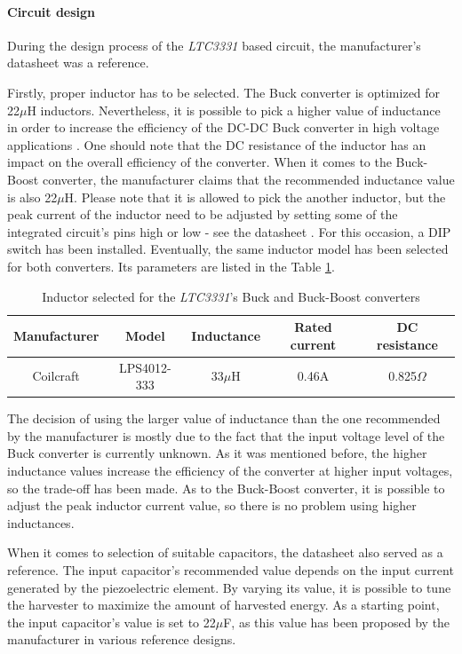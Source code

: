 \documentclass[12pt,a4paper]{article}
\begin{document}
\paragraph{Circuit design}
During the design process of the \textit{LTC3331} based circuit, the manufacturer's datasheet \cite{ltc3331_params} was a reference.
\par
Firstly, proper inductor has to be selected. The Buck converter is optimized for 22$\mu$H inductors. Nevertheless, it is possible to pick a higher value of inductance in order to increase the efficiency of the DC-DC Buck converter in high voltage applications \cite{ltc3331_params}. One should note that the DC resistance of the inductor has an impact on the overall efficiency of the converter. When it comes to the Buck-Boost converter, the manufacturer claims that the recommended inductance value is also 22$\mu$H. Please note that it is allowed to pick the another inductor, but the peak current of the inductor need to be adjusted by setting some of the integrated circuit's pins high or low - see the datasheet \cite{ltc3331_params}. For this occasion, a DIP switch has been installed. Eventually, the same inductor model has been selected for both converters. Its parameters are listed in the Table \ref{tab:ltc3331_inductor}.
\begin{table}[ht!]
\begin{tabular}{|c|c|c|c|c|}
\hline
\textbf{Manufacturer} & \textbf{Model} & \textbf{Inductance} & \textbf{Rated current} & \textbf{DC resistance}	\\ \hline
 Coilcraft & LPS4012-333 & 33$\mu$H & 0.46A & 0.825$\Omega$      \\ \hline
\end{tabular}
\caption{Inductor selected for the \textit{LTC3331}'s Buck and Buck-Boost converters \cite{ltc3331_inductor_params}}
\label{tab:ltc3331_inductor}
\end{table}
\par
The decision of using the larger value of inductance than the one recommended by the manufacturer is mostly due to the fact that the input voltage level of the Buck converter is currently unknown. As it was mentioned before, the higher inductance values increase the efficiency of the converter at higher input voltages, so the trade-off has been made. As to the Buck-Boost converter, it is possible to adjust the peak inductor current value, so there is no problem using higher inductances.
\par
When it comes to selection of suitable capacitors, the datasheet \cite{ltc3331_params} also served as a reference.
The input capacitor's recommended value depends on the input current generated by the piezoelectric element. By varying its value, it is possible to tune the harvester to maximize the amount of harvested energy. As a starting point, the input capacitor's value is set to 22$\mu$F, as this value has been proposed by the manufacturer in various reference designs.\par
\end{document}
